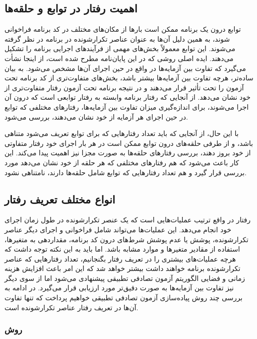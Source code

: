 \subsection{اهمیت رفتار در توابع و حلقه‌ها}

توابع درون یک برنامه ممکن است بارها از مکان‌های مختلف در کد برنامه فراخوانی شوند، به همین دلیل آن‌ها به عنوان عناصر تکرارشونده در برنامه در نظر گرفته می‌شوند. این توابع معمولاً بخش‌های مهمی از فرآیندهای اجرایی برنامه را تشکیل می‌دهند. ایده اصلی روشی که در این پایان‌نامه مطرح شده است، از اینجا نشأت می‌گیرد که تفاوت بین آزمایه‌ها در واقع در حین اجرای آن‌ها مشخص می‌شود. به بیان ساده‌تر، هرچه تفاوت بین آزمایه‌ها بیشتر باشد، بخش‌های متفاوت‌تری از کد برنامه تحت آزمون را تحت تأثیر قرار می‌دهند و در نتیجه برنامه تحت آزمون رفتار متفاوت‌تری از خود نشان می‌دهد. از آنجایی که رفتار برنامه وابسته به رفتار توابعی است که درون آن اجرا می‌شوند، برای اندازه‌گیری میزان تفاوت بین آزمایه‌ها، رفتارهای مختلفی که توابع در حین اجرای هر آزمایه از خود نشان می‌دهند، بررسی می‌شود.

با این حال، از آنجایی که باید تعداد رفتارهایی که برای توابع تعریف می‌شود متناهی باشد، و از طرفی حلقه‌های درون توابع ممکن است در هر بار اجرای خود رفتار متفاوتی از خود بروز دهند، بررسی رفتارهای حلقه‌ها به صورت مجزا نیز اهمیت پیدا می‌کند. این کار باعث می‌شود که هم رفتارهای مختلفی که هر حلقه از خود نشان می‌دهد مورد بررسی قرار گیرد و هم تعداد رفتارهایی که توابع شامل حلقه‌ها دارند، نامتناهی نشود.

\subsection{انواع مختلف تعریف رفتار}

رفتار در واقع ترتیب عملیات‌هایی است که یک عنصر تکرارشونده در طول زمان اجرای خود انجام می‌دهد. این عملیات‌ها می‌تواند شامل فراخوانی و اجرای دیگر عناصر تکرارشونده، پوشش یا عدم پوشش شرط‌های درون کد برنامه، مقداردهی به متغیرها، استفاده از مقادیر متغیرها و موارد مشابه باشد. اما باید به این نکته توجه داشت که هرچه عملیات‌های بیشتری را در تعریف رفتار بگنجانیم، تعداد رفتارهایی که عناصر تکرارشونده برنامه خواهند داشت بیشتر خواهد شد که این امر باعث افزایش هزینه زمانی و فضایی الگوریتم آزمون تصادفی تطبیقی پیشنهادی می‌شود اما از سوی دیگر نیز تفاوت بین آزمایه‌ها به صورت دقیق‌تر مورد ارزیابی قرار می‌گیرد. در ادامه به بررسی چند روش پیاده‌سازی آزمون تصادفی تطبیقی خواهیم پرداخت که تنها تفاوت آن‌ها در تعریف رفتار عناصر تکرارشونده است.

\subsubsection{روش }

